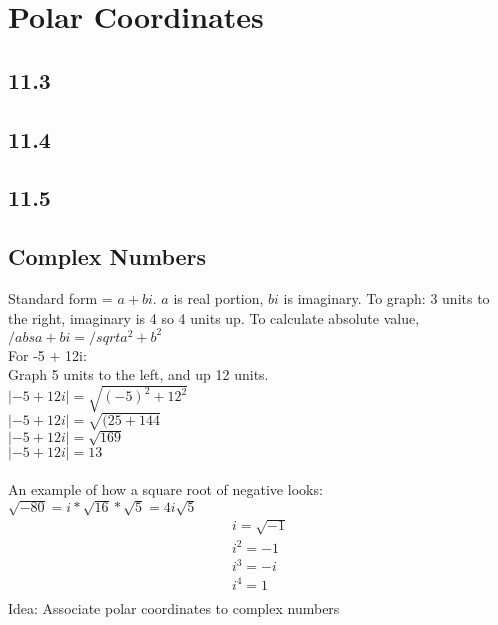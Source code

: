 \documentclass{article}
\begin{document}
        \color{Black}
    \section{Polar Coordinates}
        \subsection*{11.3}
        \subsection*{11.4}
        \subsection*{11.5}
        \color{Aquamarine}
        \subsection*{Complex Numbers}
            Standard form = $a + bi$. $a$ is real portion, $bi$ is imaginary. 
            To graph: 3 units to the right, imaginary is 4 so 4 units up. To calculate absolute value, $/abs{a+bi} = /sqrt{a^2 + b^2}$\\
            For -5 + 12i: \\
            Graph 5 units to the left, and up 12 units. \\
            $\lvert {-5 + 12i}\rvert = \sqrt{(-5)^2 + 12^2}$ \\
            $\lvert {-5 + 12i}\rvert = \sqrt{(25 + 144}$ \\
            $\lvert {-5 + 12i}\rvert = \sqrt{169}$ \\
            $\lvert {-5 + 12i}\rvert = 13$ \\
            \\
            An example of how a square root of negative looks: $\sqrt{-80} =  i * \sqrt{16} * \sqrt{5} = 4i \sqrt{5}$
            \begin{equation}
                \begin{split}
                    i = \sqrt{-1} \\
                    i^2 = -1 \\
                    i^3 = -i \\
                    i^4 = 1 \\
                \end{split}
            \end{equation}
            Idea: Associate polar coordinates to complex numbers \\
\end{document}
